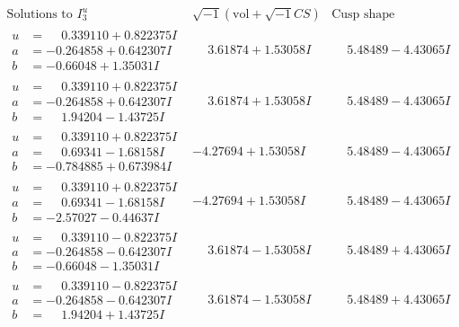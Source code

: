 \documentclass[1p]{elsarticle_modified}
\theoremstyle{definition}
\newcommand{\I}{\sqrt{-1}}
\begin{document}
$$\begin{array}{c|c|c}  
\text{Solutions to }I^u_{3}& \I (\text{vol} + \sqrt{-1}CS) & \text{Cusp shape}\\
 \hline 
\begin{aligned}
u &= \phantom{-}0.339110 + 0.822375 I \\
a &= -0.264858 + 0.642307 I \\
b &= -0.66048 + 1.35031 I\end{aligned}
 & \phantom{-}3.61874 + 1.53058 I & \phantom{-}5.48489 - 4.43065 I \\ \hline\begin{aligned}
u &= \phantom{-}0.339110 + 0.822375 I \\
a &= -0.264858 + 0.642307 I \\
b &= \phantom{-}1.94204 - 1.43725 I\end{aligned}
 & \phantom{-}3.61874 + 1.53058 I & \phantom{-}5.48489 - 4.43065 I \\ \hline\begin{aligned}
u &= \phantom{-}0.339110 + 0.822375 I \\
a &= \phantom{-}0.69341 - 1.68158 I \\
b &= -0.784885 + 0.673984 I\end{aligned}
 & -4.27694 + 1.53058 I & \phantom{-}5.48489 - 4.43065 I \\ \hline\begin{aligned}
u &= \phantom{-}0.339110 + 0.822375 I \\
a &= \phantom{-}0.69341 - 1.68158 I \\
b &= -2.57027 - 0.44637 I\end{aligned}
 & -4.27694 + 1.53058 I & \phantom{-}5.48489 - 4.43065 I \\ \hline\begin{aligned}
u &= \phantom{-}0.339110 - 0.822375 I \\
a &= -0.264858 - 0.642307 I \\
b &= -0.66048 - 1.35031 I\end{aligned}
 & \phantom{-}3.61874 - 1.53058 I & \phantom{-}5.48489 + 4.43065 I \\ \hline\begin{aligned}
u &= \phantom{-}0.339110 - 0.822375 I \\
a &= -0.264858 - 0.642307 I \\
b &= \phantom{-}1.94204 + 1.43725 I\end{aligned}
 & \phantom{-}3.61874 - 1.53058 I & \phantom{-}5.48489 + 4.43065 I \\ \hline\begin{aligned}

\end{aligned}
\end{array}$$
\end{document}
